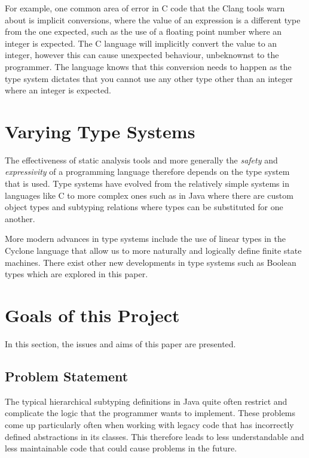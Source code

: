 \documentclass{l4proj}
\begin{document}
For example, one common area of error in C code that the Clang tools warn about is implicit conversions, where the value of an expression is a different type from the one expected, such as the use of a floating point number where an integer is expected.
The C language will implicitly convert the value to an integer, however this can cause unexpected behaviour, unbeknownst to the programmer.
The language knows that this conversion needs to happen as the type system dictates that you cannot use any other type other than an integer where an integer is expected.

\section{Varying Type Systems}

The effectiveness of static analysis tools and more generally the \emph{safety} and \emph{expressivity} of a programming language therefore depends on the type system that is used.
Type systems have evolved from the relatively simple systems in languages like C to more complex ones such as in Java where there are custom object types and subtyping relations where types can be substituted for one another.

More modern advances in type systems include the use of linear types in the Cyclone \citep{grossman2002} language that allow us to more naturally and logically define finite state machines.
There exist other new developments in type systems such as Boolean types which are explored in this paper.

\section{Goals of this Project}

In this section, the issues and aims of this paper are presented.

\subsection{Problem Statement}

The typical hierarchical subtyping definitions in Java quite often restrict and complicate the logic that the programmer wants to implement.
These problems come up particularly often when working with legacy code that has incorrectly defined abstractions in its classes.
This therefore leads to less understandable and less maintainable code that could cause problems in the future.
\end{document}
